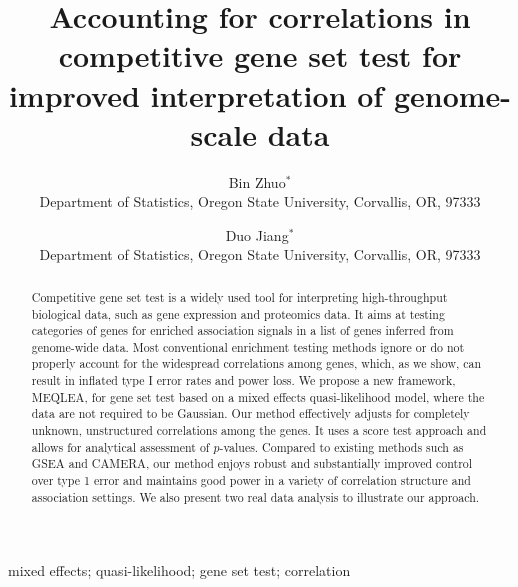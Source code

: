 \documentclass[useAMS,usenatbib, galley]{biom}
\title[This is an Example of Recto Running Head]{Accounting for correlations in competitive gene set test for improved interpretation of genome-scale data}
\author{Bin Zhuo$^{*}$\email{zhuob@oregonstate.edu} \\
	   Department of Statistics, Oregon State University, Corvallis, OR, 97333
	   \and 
	   Duo Jiang$^{*}$\email{jiangd@stat.oregonstate.edu}\\
	    Department of Statistics, Oregon State University, Corvallis, OR, 97333
	   }
\newcommand{\OurMethod}{MEQLEA}
\begin{document}




\label{firstpage}


\begin{abstract}
Competitive gene set test is a widely used tool for interpreting high-throughput biological data, such as gene expression and proteomics data. It aims at testing categories of genes for enriched association signals in a list of genes inferred from genome-wide data. Most conventional enrichment testing methods ignore or do not properly account for the widespread correlations among genes, which, as we show, can result in inflated type I error rates and power loss. We propose a new framework, \OurMethod, for gene set test based on a mixed effects quasi-likelihood model, where the data are not required to be Gaussian. Our method effectively adjusts for completely unknown, unstructured correlations among the genes. It uses a score test approach and allows for analytical assessment of $p$-values. Compared to existing methods such as GSEA and CAMERA, our method enjoys robust and substantially improved control over type 1 error and maintains good power in a variety of correlation structure and association settings. We also present two real data analysis to illustrate our approach.
\end{abstract}

%
%

\begin{keywords}
mixed effects; quasi-likelihood; gene set test; correlation
\end{keywords}

\maketitle
\end{document}
